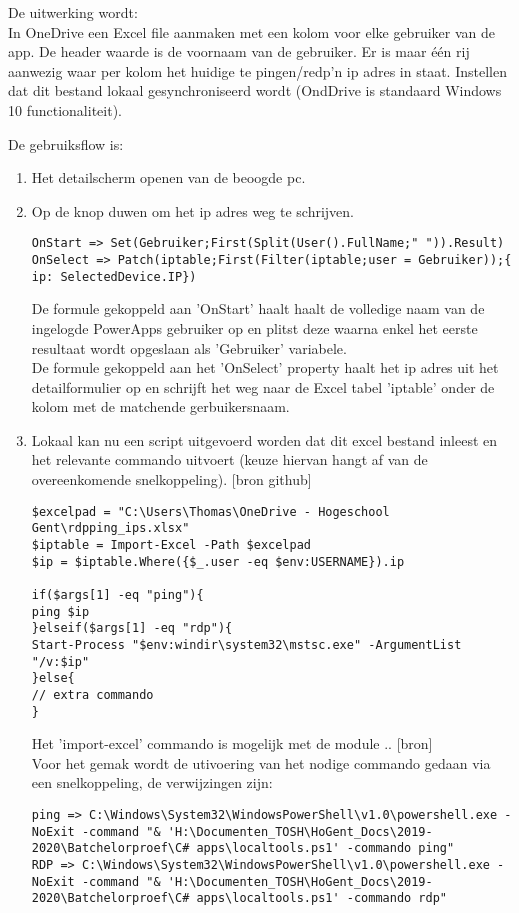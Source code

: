 De uitwerking wordt:\\
In OneDrive een Excel file aanmaken met een kolom voor elke gebruiker van de app. De header waarde is  de voornaam van de gebruiker. Er is maar één rij aanwezig waar per kolom het huidige te pingen/redp'n ip adres in staat. Instellen dat dit bestand lokaal gesynchroniseerd wordt (OndDrive is standaard Windows 10 functionaliteit).

De gebruiksflow is:
\begin{enumerate}
    \item Het detailscherm openen van de beoogde pc.
    \item Op de knop duwen om het ip adres weg te schrijven.
\begin{lstlisting}
OnStart => Set(Gebruiker;First(Split(User().FullName;" ")).Result)
OnSelect => Patch(iptable;First(Filter(iptable;user = Gebruiker));{ ip: SelectedDevice.IP})
\end{lstlisting}
    De formule gekoppeld aan 'OnStart' haalt haalt de volledige naam van de ingelogde PowerApps gebruiker op en plitst deze waarna enkel het eerste resultaat wordt opgeslaan als 'Gebruiker' variabele.\\
    De formule gekoppeld aan het 'OnSelect' property haalt het ip adres uit het detailformulier op en schrijft het weg naar de Excel tabel 'iptable' onder de kolom met de matchende gerbuikersnaam.
    \item Lokaal kan nu een script uitgevoerd worden dat dit excel bestand inleest en het relevante commando uitvoert (keuze hiervan hangt af van de overeenkomende snelkoppeling). [bron github]
\begin{lstlisting}[style=powershellStyle]
$excelpad = "C:\Users\Thomas\OneDrive - Hogeschool Gent\rdpping_ips.xlsx"
$iptable = Import-Excel -Path $excelpad
$ip = $iptable.Where({$_.user -eq $env:USERNAME}).ip

if($args[1] -eq "ping"){
ping $ip
}elseif($args[1] -eq "rdp"){
Start-Process "$env:windir\system32\mstsc.exe" -ArgumentList "/v:$ip"
}else{
// extra commando
}
\end{lstlisting}
    Het 'import-excel' commando is mogelijk met de module .. [bron]\\
    Voor het gemak wordt de utivoering van het nodige commando gedaan via een snelkoppeling, de verwijzingen zijn:
\begin{lstlisting}
ping => C:\Windows\System32\WindowsPowerShell\v1.0\powershell.exe -NoExit -command "& 'H:\Documenten_TOSH\HoGent_Docs\2019-2020\Batchelorproef\C# apps\localtools.ps1' -commando ping"
RDP => C:\Windows\System32\WindowsPowerShell\v1.0\powershell.exe -NoExit -command "& 'H:\Documenten_TOSH\HoGent_Docs\2019-2020\Batchelorproef\C# apps\localtools.ps1' -commando rdp"
\end{lstlisting}
\end{enumerate}


